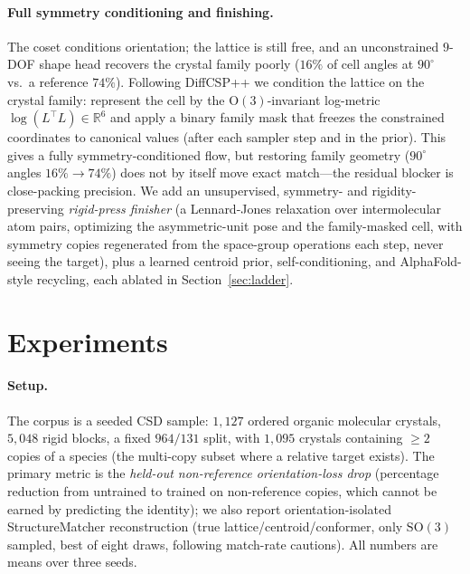 \documentclass{article}
\begin{document}
\paragraph{Full symmetry conditioning and finishing.}
The coset conditions orientation; the lattice is still free, and an unconstrained
$9$-DOF shape head recovers the crystal family poorly ($16\%$ of cell angles at
$90^\circ$ vs.\ a reference $74\%$). Following DiffCSP++\cite{jiao2024diffcsppp} we
condition the lattice on the crystal family: represent the cell by the
$\mathrm{O}(3)$-invariant log-metric $\log(L^\top L)\in\mathbb{R}^6$ and apply a
binary family mask that freezes the constrained coordinates to canonical values
(after each sampler step and in the prior). This gives a fully symmetry-conditioned
flow, but restoring family geometry ($90^\circ$ angles $16\%\!\to\!74\%$) does not
by itself move exact match---the residual blocker is close-packing precision. We
add an unsupervised, symmetry- and rigidity-preserving \emph{rigid-press finisher}
(a Lennard-Jones relaxation over intermolecular atom pairs, optimizing the
asymmetric-unit pose and the family-masked cell, with symmetry copies regenerated
from the space-group operations each step, never seeing the target), plus a learned
centroid prior, self-conditioning, and AlphaFold-style recycling, each ablated in
Section~\ref{sec:ladder}.

\section{Experiments}
\paragraph{Setup.}
The corpus is a seeded CSD sample\cite{groom2016csd}: $1{,}127$ ordered organic
molecular crystals, $5{,}048$ rigid blocks, a fixed $964/131$ split, with
$1{,}095$ crystals containing $\ge2$ copies of a species (the multi-copy subset
where a relative target exists). The primary metric is the \emph{held-out
non-reference orientation-loss drop} (percentage reduction from untrained to
trained on non-reference copies, which cannot be earned by predicting the
identity); we also report orientation-isolated StructureMatcher\cite{ong2013pymatgen}
reconstruction (true lattice/centroid/conformer, only $\mathrm{SO}(3)$ sampled,
best of eight draws, following match-rate cautions\cite{martirossyan2025matching}).
All numbers are means over three seeds.
\end{document}
